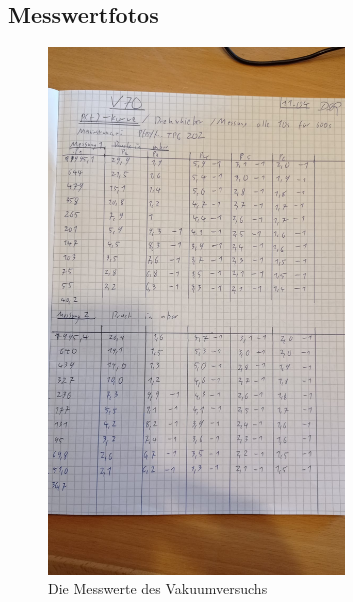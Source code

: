 \newpage
\subsection{Messwertfotos}

\begin{figure}[h]
    \centering
    \includegraphics[width=0.7\textwidth]{latex/images/Messwerte_1.jpeg}
    \caption{Die Messwerte des Vakuumversuchs}
\end{figure}

